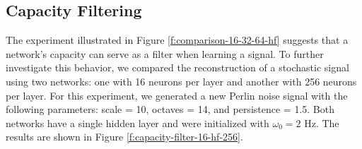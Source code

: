 
\subsection{Capacity Filtering}

The experiment illustrated in Figure \ref{f:comparison-16-32-64-hf} suggests that a network's capacity can serve as a filter when learning a signal. To further investigate this behavior, we compared the reconstruction of a stochastic signal using two networks: one with 16 neurons per layer and another with 256 neurons per layer. For this experiment, we generated a new Perlin noise signal with the following parameters: scale = 10, octaves = 14, and persistence = 1.5. Both networks have a single hidden layer and were initialized with $\omega_0=2$ Hz. The results are shown in Figure \ref{f:capacity-filter-16-hf-256}. 

